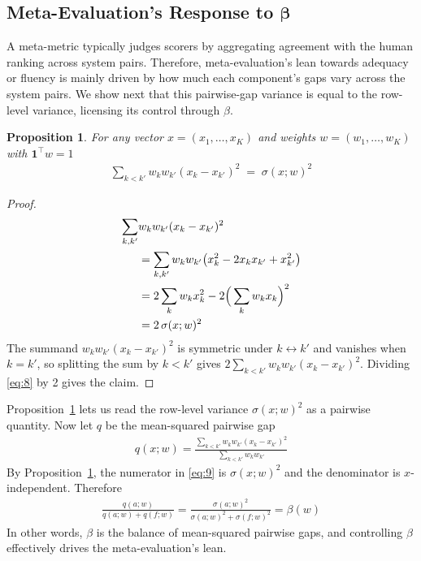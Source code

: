 \documentclass[11pt]{article}
\newtheorem{proposition}{Proposition}
\begin{document}
\subsection{Meta-Evaluation's Response to \texorpdfstring{$\boldsymbol\beta$}{Beta}}
\label{sec:pairwise-gaps}

A meta-metric typically judges scorers by aggregating agreement with the human ranking across system pairs. Therefore, meta-evaluation's lean towards adequacy or fluency is mainly driven by how much each component's gaps vary across the system pairs. We show next that this pairwise-gap variance is equal to the row-level variance, licensing its control through $\beta$.



\begin{proposition}
\label{lem:pairwise-gap}
For any vector $x{=}(x_1,\dots,x_K)$ and weights $w{=}(w_1,\dots,w_K)$ with $\mathbf 1^\top w = 1$
\begin{align}
  \sum_{k<k'} w_k w_{k'} (x_k - x_{k'})^2 \;=\; \sigma(x;w)^2
\end{align}
\end{proposition}
\begin{proof}
\begin{align}
  \sum_{k,k'} &w_kw_{k'} (x_k-x_{k'})^2 \notag\\&= \sum_{k,{k'}} w_kw_{k'}\big(x_k^2 - 2x_kx_{k'} + x_{k'}^2\big) \nonumber\\
  &= 2\sum_k w_kx_k^2 - 2\Big(\sum_k w_kx_k\Big)^2 \nonumber\\
  &= 2\,\sigma(x;w)^2 \label{eq:8}
\end{align}
The summand $w_kw_{k'}(x_k{-}x_{k'})^2$ is symmetric under $k{\leftrightarrow}{k'}$ and vanishes when $k{=}{k'}$, so splitting the sum by $k{<}{k'}$ gives $2\sum_{k<{k'}} w_kw_{k'}(x_k-x_{k'})^2$. Dividing \eqref{eq:8} by 2 gives the claim.
\end{proof}

Proposition~\ref{lem:pairwise-gap} lets us read the row-level variance $\sigma(x;w)^2$ as a pairwise quantity. Now let $q$ be the mean-squared pairwise gap
\begin{align}
  q(x;w) = \frac{\sum_{k<{k'}} w_kw_{k'} (x_k-x_{k'})^2}{\sum_{k<{k'}} w_kw_{k'}}\label{eq:9}
\end{align}
By Proposition~\ref{lem:pairwise-gap}, the numerator in \eqref{eq:9} is $\sigma(x;w)^2$ and the denominator is $x$-independent. Therefore
\begin{align}
  \frac{q(a;w)}{q(a;w){+}q(f;w)} = \frac{\sigma(a;w)^2}{\sigma(a;w)^2{+}\sigma(f;w)^2} = \beta(w)
\end{align}
In other words, $\beta$ is the balance of mean-squared pairwise gaps, and controlling $\beta$ effectively drives the meta-evaluation's lean.
\end{document}
